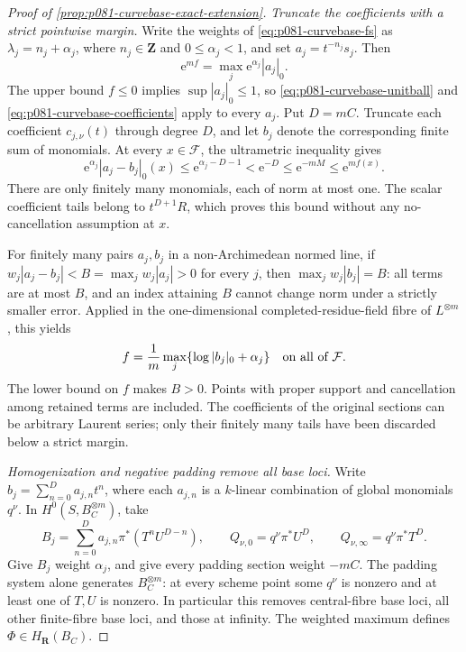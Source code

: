 \begin{proof}[Proof of \cref{prop:p081-curvebase-exact-extension}]
\emph{Truncate the coefficients with a strict pointwise margin.}
Write the weights of \eqref{eq:p081-curvebase-fs} as
\(\lambda_j=n_j+\alpha_j\), where \(n_j\in\mathbf Z\) and
\(0\leq\alpha_j<1\), and set \(a_j=t^{-n_j}s_j\). Then
\[
                \mathrm e^{mf}=\max_j\mathrm e^{\alpha_j}|a_j|_0 .
\]
The upper bound \(f\leq0\) implies \(\sup|a_j|_0\leq1\), so
\eqref{eq:p081-curvebase-unitball} and
\eqref{eq:p081-curvebase-coefficients} apply to every \(a_j\).
Put \(D=mC\). Truncate each coefficient \(c_{j,\nu}(t)\) through degree
\(D\), and let \(b_j\) denote the corresponding finite sum of monomials.
At every \(x\in\mathcal F\), the ultrametric inequality gives
\begin{equation}\label{eq:p081-curvebase-tail}
 \mathrm e^{\alpha_j}|a_j-b_j|_0(x)
 \leq\mathrm e^{\alpha_j-D-1}
 <\mathrm e^{-D}\leq\mathrm e^{-mM}\leq\mathrm e^{mf(x)}.
\end{equation}
There are only finitely many monomials, each of norm at most one.
The scalar coefficient tails belong to \(t^{D+1}R\), which proves this
bound without any no-cancellation assumption at \(x\).

For finitely many pairs \(a_j,b_j\) in a non-Archimedean normed line,
if \(w_j|a_j-b_j|<B=\max_jw_j|a_j|>0\) for every \(j\), then
\(\max_jw_j|b_j|=B\): all terms are at most \(B\), and an index
attaining \(B\) cannot change norm under a strictly smaller error.
Applied in the one-dimensional completed-residue-field fibre of
\(L^{\otimes m}\), this yields
\begin{equation}\label{eq:p081-curvebase-exact-tail}
             f=\frac1m\max_j\{\log|b_j|_0+\alpha_j\}
                         \quad\hbox{on all of }\mathcal F.
\end{equation}
The lower bound on \(f\) makes \(B>0\). Points with proper support and
cancellation among retained terms are included. The coefficients of the
original sections can be arbitrary Laurent series; only their finitely
many tails have been discarded below a strict margin.

\emph{Homogenization and negative padding remove all base loci.}
Write \(b_j=\sum_{n=0}^D a_{j,n}t^n\), where each \(a_{j,n}\) is a
\(k\)-linear combination of global monomials \(q^\nu\). In
\(H^0(S,B_C^{\otimes m})\), take
\[
 B_j=\sum_{n=0}^D a_{j,n}\pi^*(T^nU^{D-n}),\qquad
 Q_{\nu,0}=q^\nu\pi^*U^D,\qquad
 Q_{\nu,\infty}=q^\nu\pi^*T^D .
\]
Give \(B_j\) weight \(\alpha_j\), and give every padding section
weight \(-mC\). The padding system alone generates \(B_C^{\otimes m}\):
at every scheme point some \(q^\nu\) is nonzero and at least one of
\(T,U\) is nonzero. In particular this removes central-fibre base loci,
all other finite-fibre base loci, and those at infinity. The weighted
maximum defines \(\Phi\in H_{\mathbf R}(B_C)\).


\end{proof}
